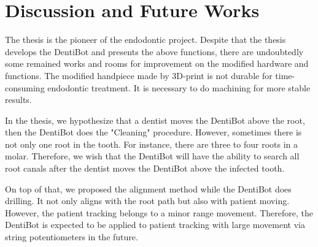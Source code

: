 \section{Discussion and Future Works}
\hspace*{6mm}The thesis is the pioneer of the endodontic project. Despite that the thesis develops the DentiBot and presents the above functions, there are undoubtedly some remained works and rooms for improvement on the modified hardware and functions. The modified handpiece made by 3D-print is not durable for time-consuming endodontic treatment. It is necessary to do machining for more stable results. 
\par 
In the thesis, we hypothesize that a dentist moves the DentiBot above the root, then the DentiBot does the "Cleaning" procedure. However, sometimes there is not only one root in the tooth. For instance, there are three to four roots in a molar. Therefore, we wish that the DentiBot will have the ability to search all root canals after the dentist moves the DentiBot above the infected tooth. 
\par
On top of that, we proposed the alignment method while the DentiBot does drilling. It not only aligns with the root path but also with patient moving. However, the patient tracking belongs to a minor range movement. Therefore, the DentiBot is expected to be applied to patient tracking with large movement via string potentiometers in the future.			